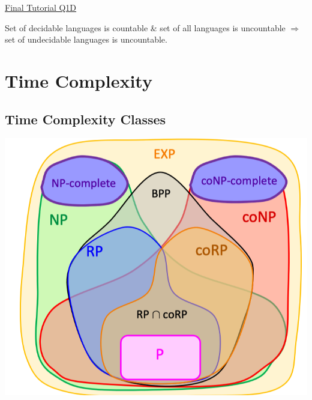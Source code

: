 \documentclass[10pt,landscape,a4paper]{article}
\begin{document}
\begin{multicols*}{3}
\underline{Final Tutorial Q1D}

Set of decidable languages is countable \& set of all languages is uncountable $\Rightarrow$ set of undecidable languages is uncountable.

\section{Time Complexity}

\subsection{Time Complexity Classes}

\includegraphics[scale=0.3]{time_complexity}


\end{multicols*}
\end{document}
